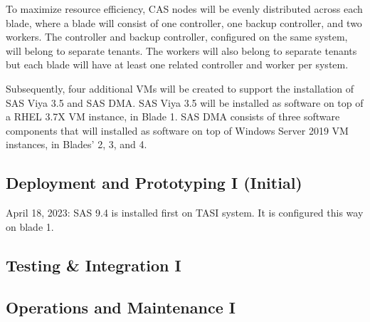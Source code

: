 To maximize resource efficiency, CAS nodes will be evenly distributed across each blade, where a blade will consist of one controller, one backup controller, and two workers. The controller and backup controller, configured on the same system, will belong to separate tenants. The workers will also belong to separate tenants but each blade will have at least one related controller and worker per system. 

Subsequently, four additional VMs will be created to support the installation of SAS Viya 3.5 and SAS DMA. SAS Viya 3.5 will be installed as software on top of a RHEL 3.7X VM instance, in Blade 1. SAS DMA consists of three software components that will installed as software on top of Windows Server 2019 VM instances, in Blades' 2, 3, and 4. 

\subsection{Deployment and Prototyping I (Initial)}

April 18, 2023:
SAS 9.4 is installed first on TASI system. It is configured this way on blade 1. 

\subsection{Testing \& Integration I}

\subsection{Operations and Maintenance I}